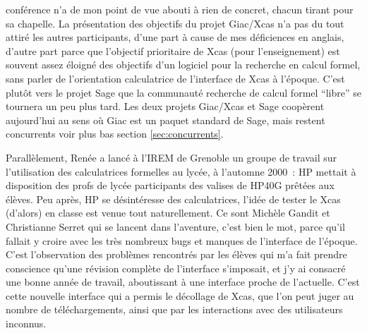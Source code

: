 \documentclass[a4paper,11pt]{book}
\begin{document}
\begin{giacjshere}
conf\'erence n'a de mon point de vue abouti \`a rien de concret,
chacun tirant pour sa chapelle. La pr\'esentation des objectifs du projet 
Giac/Xcas n'a pas du tout attir\'e les autres participants,
d'une part \`a cause de mes d\'eficiences en anglais,
d'autre part parce que l'objectif prioritaire de Xcas (pour l'enseignement)
est souvent assez \'eloign\'e des objectifs d'un logiciel
pour la recherche en calcul formel, sans parler de l'orientation
calculatrice de l'interface de Xcas \`a l'\'epoque.
C'est plut\^ot vers le projet Sage que la
communaut\'e recherche de calcul formel ``libre'' se tournera un peu
plus tard. Les deux projets Giac/Xcas et Sage coop\`erent aujourd'hui
au sens o\`u Giac est un paquet standard de Sage, mais restent concurrents 
voir plus bas section \ref{sec:concurrents}.

Parall\`element, Ren\'ee a lanc\'e \`a l'IREM de Grenoble
un groupe de travail sur l'utilisation des calculatrices
formelles au lyc\'ee, \`a l'automne 2000~:
HP mettait \`a disposition
des profs de lyc\'ee participants des valises de HP40G
pr\^et\'ees aux \'el\`eves. Peu apr\`es, HP se d\'esint\'eresse
des calculatrices, l'id\'ee de tester le Xcas (d'alors) en classe
est venue tout naturellement. Ce sont Mich\`ele Gandit et
Christianne Serret qui se lancent dans l'aventure, c'est bien
le mot, parce qu'il fallait y croire avec les tr\`es nombreux
bugs et manques de l'interface de l'\'epoque. C'est
l'observation des probl\`emes rencontr\'es par les \'el\`eves
qui m'a fait prendre conscience qu'une r\'evision compl\`ete
de l'interface s'imposait, et j'y ai consacr\'e une bonne ann\'ee
de travail, aboutissant \`a une interface proche de l'actuelle.
C'est cette nouvelle interface qui a permis le
d\'ecollage de Xcas, que l'on peut juger
au nombre de t\'el\'echargements, ainsi que par
les interactions avec des utilisateurs inconnus.


\end{giacjshere}
\end{document}
